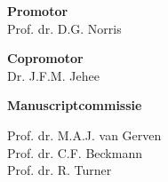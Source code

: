 {\setlength{\parindent}{0cm}\raggedright\smaller

\hspace{-12pt}\textbf{Promotor}\\
Prof. dr. D.G. Norris
\vspace{12pt}

\hspace{-12pt}\textbf{Copromotor}\\
Dr. J.F.M. Jehee
\vspace{20pt}

\hspace{-12pt}\textbf{Manuscriptcommissie}

\vspace{6pt}
Prof. dr. M.A.J. van Gerven\\

\vspace{6pt}
Prof. dr. C.F. Beckmann\\

\vspace{6pt}
Prof. dr. R. Turner\\

\vfill
}

\newpage


\thispagestyle{empty}

{\setlength{\parindent}{0cm}
\begin{flushright}
\end{flushright}
}


